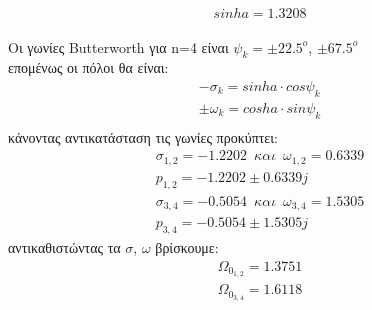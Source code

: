 \documentclass{article}
\begin{document}
{\begin{equation*}
\end{equation*}
\begin{equation*}
  \boxed{sinha = 1.3208}
\end{equation*}
\\ Οι γωνίες Butterworth για n=4 είναι $ψ_k = \pm 22.5^o$, $\pm 67.5^o$
\\ επομένως οι πόλοι θα είναι:
\begin{align*}
-σ_k = sinha \cdot cosψ_k \\
\pm ω_k = cosha \cdot sin ψ_k \\
\end{align*}
κάνοντας αντικατάσταση τις γωνίες προκύπτει:
\begin{align*}
σ_{1,2} = -1.2202 \enspace και \enspace ω_{1,2} = 0.6339 \\
\boxed{p_{1,2} = -1.2202 \pm 0.6339j} \\
σ_{3,4} = - 0.5054 \enspace και \enspace ω_{3,4} = 1.5305 \\
\boxed{p_{3,4} = -0.5054 \pm 1.5305j}
\end{align*}
αντικαθιστώντας τα $σ$, $ω$ βρίσκουμε:
\begin{align*}
Ω_{0_{1,2}} = 1.3751 \\
Ω_{0_{3,4}} = 1.6118 \\
\end{align*}

}
\end{document}
